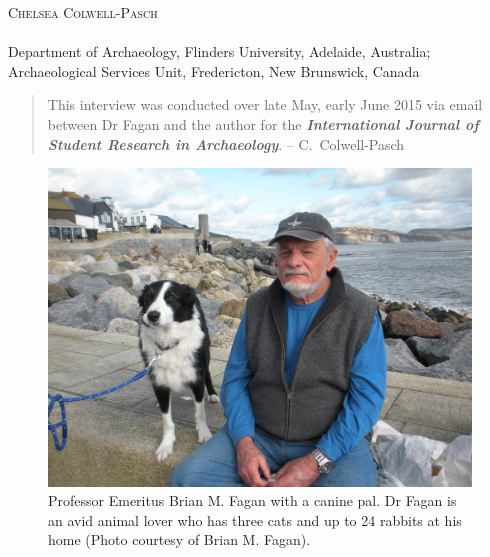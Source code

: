 \openingarticle
\def\ppages{\pagerange{Pasch:firstpage}{Pasch:lastpage}}
\def\shorttitle{Interview: Brian Fagan}
\def\maintitle{Brian Fagan, Ph.D. \textit{Professor Emeritus at the University of California, Santa Barbara}}
\def\shortauthor{Chelsea Colwell-Pasch}
\def\authormail{Chelsea.Colwell-Pasch@gnb.ca}
\def\affiliation{Department of Archaeology, Flinders University, Adelaide, Australia; \\ \noindent Archaeological Services Unit, Fredericton, New Brunswick, Canada}
\begin{center}
	{\Large\scshape\shortauthor}\\[1em]
	\email \\
	\affiliation
\end{center}
\vspace{3em}
\midarticle
\label{Pasch:firstpage}
 
\blockquote{This interview was conducted over late May, early June 2015 via email between Dr Fagan and the author for the \textbf{\textit{International Journal of Student Research in Archaeology}}. -- C.~Colwell-Pasch}	
	
	\begin{figure}[!htb]
		\includegraphics[width=\linewidth]{figures/pasch_Fig1}
		\centering
		\caption{Professor Emeritus Brian M. Fagan with a canine pal. Dr Fagan is an avid animal lover who has three cats and up to 24 rabbits at his home (Photo courtesy of Brian M. Fagan).}
		\label{fig:pasch_Fig1}
	\end{figure}
	
